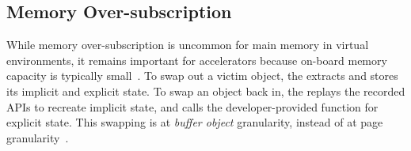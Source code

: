 






\subsection{Memory Over-subscription}


While memory over-subscription is uncommon for main memory in virtual environments, it remains important for accelerators because on-board memory capacity is typically small~\cite{etc19asplos,mosaic,mask}. %
To swap out a victim object, the \worker extracts and stores its implicit and explicit state.
To swap an object back in, the \worker replays the recorded APIs to recreate implicit state, and calls the developer-provided function for explicit state.
This swapping is at \emph{buffer object} granularity, instead of at page granularity~\cite{ji2013rsvm,kehne2015gpuswap,wang2014gdm}.

